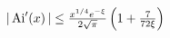$|\mathop{\mathrm{Ai}\/}\nolimits'\!\left(x\right)|\leq\frac{x^{1/4}e^{-\xi}}{2%
\sqrt{\pi}}\left(1+\frac{7}{72\xi}\right)$